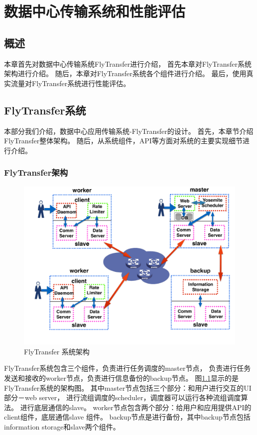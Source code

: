 \chapter{数据中心传输系统和性能评估} \label{cha:application-transfer-system}
\section{概述}
本章首先对数据中心传输系统FlyTransfer进行介绍，
首先本章对FlyTransfer系统架构进行介绍。
随后，本章对FlyTransfer系统各个组件进行介绍。
最后，使用真实流量对FlyTransfer系统进行性能评估。
\section{FlyTransfer系统}
本部分我们介绍，数据中心应用传输系统-FlyTransfer的设计。
首先，本章节介绍FlyTransfer整体架构。
随后，从系统组件，API等方面对系统的主要实现细节进行介绍。
\subsection{FlyTransfer架构}
\begin{figure}[b]
\begin{center}
\includegraphics [width=0.8\columnwidth] {figures/Yosemite/figs/system/YosemiteSystem.pdf}
\caption{FlyTransfer 系统架构}
\label{Yosemite-design-fig}
\end{center}
\end{figure}
FlyTransfer系统包含三个组件，负责进行任务调度的master节点，
负责进行任务发送和接收的worker节点，负责进行信息备份的backup节点。
图\ref{Yosemite-design-fig}显示的是FlyTransfer系统的架构图。
其中master节点包括三个部分：和用户进行交互的UI部分－web server，
进行流组调度的scheduler，调度器可以运行各种流组调度算法。
进行底层通信的slave。
worker节点包含两个部分：给用户和应用提供API的client组件，底层通信slave 组件。
backup节点是进行备份，其中backup节点包括information storage和slave两个组件。
